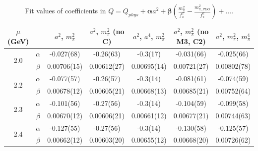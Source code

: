 \documentclass[12pt]{extarticle}
\begin{document}
\begin{table}[h!]
\begin{center}
\begin{tabular}{|c c|c|c|c|c|c|}
\hline
$\mu$ (GeV) &  & $a^2$, $m_\pi^2$& $a^2$, $m_\pi^2$ (no C)& $a^2$, $a^4$, $m_\pi^2$& $a^2$, $m_\pi^2$ (no M3, C2)& $a^2$, $m_\pi^2$, $m_\pi^4$\\
\hline
\multirow{2}{0.5in}{2.0} & $\alpha$ & -0.027(68)& -0.26(63)& -0.3(17)& -0.031(66)& -0.025(66)\\
 & $\beta$ & 0.00706(15)& 0.00612(27)& 0.00695(14)& 0.00721(27)& 0.00802(78)\\
\hline
\multirow{2}{0.5in}{2.2} & $\alpha$ & -0.077(57)& -0.26(57)& -0.3(14)& -0.081(61)& -0.074(59)\\
 & $\beta$ & 0.00678(12)& 0.00605(21)& 0.00668(13)& 0.00685(21)& 0.00752(64)\\
\hline
\multirow{2}{0.5in}{2.3} & $\alpha$ & -0.101(56)& -0.27(56)& -0.3(14)& -0.104(59)& -0.099(58)\\
 & $\beta$ & 0.00670(12)& 0.00606(21)& 0.00661(12)& 0.00677(21)& 0.00744(63)\\
\hline
\multirow{2}{0.5in}{2.4} & $\alpha$ & -0.127(55)& -0.27(56)& -0.3(14)& -0.130(58)& -0.125(57)\\
 & $\beta$ & 0.00662(12)& 0.00603(20)& 0.00655(12)& 0.00668(20)& 0.00726(62)\\
\hline
\end{tabular}
\caption{Fit values of coefficients in $Q = Q_{phys} + \mathbf{\alpha} a^2 + \mathbf{\beta}\left(\frac{m_\pi^2}{f_\pi^2}-\frac{m_{\pi,PDG}^2}{f_\pi^2}\right) + \ldots$.}
\end{center}
\end{table}




















\clearpage
\end{document}
